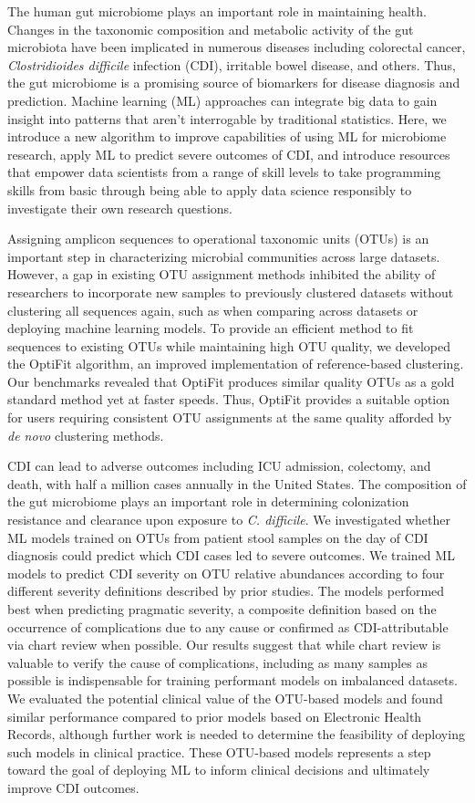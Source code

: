 The human gut microbiome plays an important role in maintaining health.
Changes in the taxonomic composition and metabolic activity of the gut
microbiota have been implicated in numerous diseases including colorectal
cancer, \textit{Clostridioides difficile} infection (CDI), irritable bowel disease,
and others.
Thus, the gut microbiome is a promising source of biomarkers for disease
diagnosis and prediction.
Machine learning (ML) approaches can integrate big data to gain insight into
patterns that aren't interrogable by traditional statistics.
Here, we introduce a new algorithm to improve capabilities of using ML for
microbiome research,
apply ML to predict severe outcomes of CDI,
and introduce resources that empower data scientists from a range of skill
levels to take programming skills from basic through being able to apply data
science responsibly to investigate their own research questions.

Assigning amplicon sequences to operational taxonomic units (OTUs) is an
important step in characterizing microbial communities across large datasets.
However, a gap in existing OTU assignment methods inhibited the ability of
researchers to incorporate new samples to previously clustered datasets without
clustering all sequences again, such as when comparing across datasets or
deploying machine learning models.
To provide an efficient method to fit sequences to existing OTUs while
maintaining high OTU quality, we developed the OptiFit algorithm, an improved
implementation of reference-based clustering.
Our benchmarks revealed that OptiFit produces similar quality OTUs as a gold
standard method yet at faster speeds.
Thus, OptiFit provides a suitable option for users requiring consistent OTU
assignments at the same quality afforded by \textit{de novo} clustering methods.

CDI can lead to adverse outcomes including ICU admission, colectomy, and death,
with half a million cases annually in the United States. The composition of the
gut microbiome plays an important role in determining colonization resistance
and clearance upon exposure to \textit{C. difficile}.
We investigated whether ML models trained on OTUs from patient stool samples on
the day of CDI diagnosis could predict which CDI cases led to severe outcomes.
We trained ML models to predict CDI severity on OTU relative abundances
according to four different severity definitions described by prior studies.
The models performed best when predicting pragmatic severity, a composite
definition based on the occurrence of complications due to any cause or
confirmed as CDI-attributable via chart review when possible.
Our results suggest that while chart review is valuable to verify the cause of
complications, including as many samples as possible is indispensable for
training performant models on imbalanced datasets.
We evaluated the potential clinical value of the OTU-based models and found
similar performance compared to prior models based on Electronic Health Records,
although further work is needed to determine the feasibility of deploying such
models in clinical practice.
These OTU-based models represents a step toward the goal of deploying ML to
inform clinical decisions and ultimately improve CDI outcomes.

